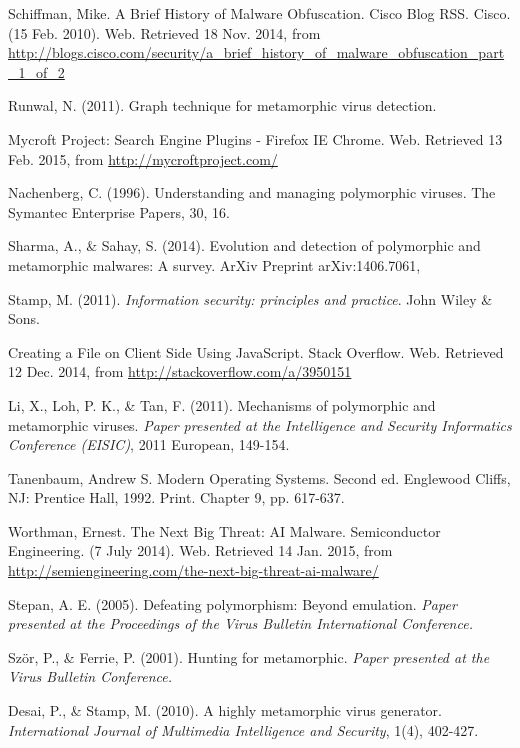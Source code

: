 \begin{thebibliography}{10}
 Schiffman, Mike. A Brief History of Malware Obfuscation. Cisco Blog RSS. Cisco. (15 Feb. 2010). Web. Retrieved 18 Nov. 2014, from \\
\url{http://blogs.cisco.com/security/a_brief_history_of_malware_obfuscation_part_1_of_2 }

 Runwal, N. (2011). Graph technique for metamorphic virus detection.

 Mycroft Project: Search Engine Plugins - Firefox IE Chrome. Web. Retrieved 13 Feb. 2015, from \url{http://mycroftproject.com/}

 Nachenberg, C. (1996). Understanding and managing polymorphic viruses. The Symantec Enterprise Papers, 30, 16.

 Sharma, A., \& Sahay, S. (2014). Evolution and detection of polymorphic and metamorphic malwares: A survey. ArXiv Preprint arXiv:1406.7061,

 Stamp, M. (2011). {\it Information security: principles and practice}. John Wiley \& Sons.

 Creating a File on Client Side Using JavaScript. Stack Overflow. Web. Retrieved 12 Dec. 2014, from \url{http://stackoverflow.com/a/3950151}

 Li, X., Loh, P. K., \& Tan, F. (2011). Mechanisms of polymorphic and metamorphic viruses. {\it Paper presented at the Intelligence and Security Informatics Conference (EISIC)}, 2011 European, 149-154.

 Tanenbaum, Andrew S. Modern Operating Systems. Second ed. Englewood Cliffs, NJ: Prentice Hall, 1992. Print. Chapter 9, pp. 617-637.

 Worthman, Ernest. The Next Big Threat: AI Malware. Semiconductor Engineering. (7 July 2014). Web. Retrieved 14 Jan. 2015, from \\
\url{http://semiengineering.com/the-next-big-threat-ai-malware/}

 Stepan, A. E. (2005). Defeating polymorphism: Beyond emulation. {\it Paper presented at the Proceedings of the Virus Bulletin International Conference.}

 Ször, P., \& Ferrie, P. (2001). Hunting for metamorphic. {\it Paper presented at the Virus Bulletin Conference.}

 Desai, P., \& Stamp, M. (2010). A highly metamorphic virus generator. {\it International Journal of Multimedia Intelligence and Security}, 1(4), 402-427.


\end{thebibliography}
